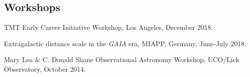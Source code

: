 \documentclass[margin,line]{res}
\newenvironment{list2}{
  \begin{list}{$\bullet$}{%
      \setlength{\itemsep}{0in}
      \setlength{\parsep}{0in} \setlength{\parskip}{0in}
      \setlength{\topsep}{0in} \setlength{\partopsep}{0in} 
      \setlength{\leftmargin}{0.2in}}}{\end{list}}
\begin{document}
\begin{resume}




\section{\sc Workshops}
\begin{etaremune}
	\item TMT Early Career Initiative Workshop, Los Angeles, December 2018.
	\item Extragalactic distance scale in the \textit{GAIA} era, MIAPP, Germany, June-July 2018.
	\item Mary Lea \& C. Donald Shane Observational Astronomy Workshop, UCO/Lick Observatory, October 2014.
\end{etaremune}


%



\end{resume}
\end{document}
